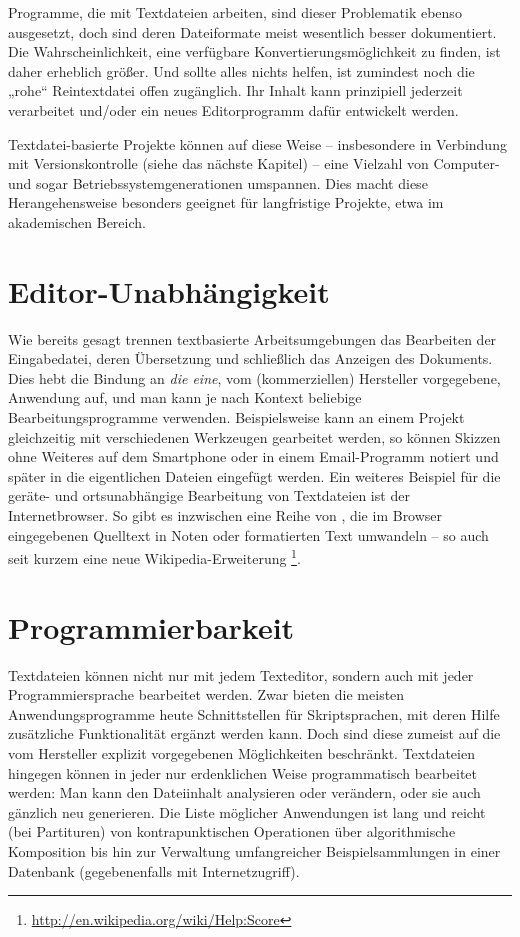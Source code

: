 \documentclass[DIV=12]{scrreprt}
\begin{document}
Programme, die mit Textdateien arbeiten, sind dieser Problematik ebenso ausgesetzt, doch sind deren Dateiformate meist wesentlich besser dokumentiert.
Die Wahrscheinlichkeit, eine verfügbare Konvertierungsmöglichkeit zu finden, ist daher erheblich größer.
Und sollte alles nichts helfen, ist zumindest noch die „rohe“ Reintextdatei offen zugänglich.
Ihr Inhalt kann prinzipiell jederzeit verarbeitet und/oder ein neues Editorprogramm dafür entwickelt werden.

Textdatei-basierte Projekte können auf diese Weise -- insbesondere in Verbindung mit Versionskontrolle (siehe das nächste Kapitel) -- eine Vielzahl von Computer- und sogar Betriebssystemgenerationen umspannen.
Dies macht diese Herangehensweise besonders geeignet für langfristige Projekte, etwa im akademischen Bereich.

\section{Editor-Unabhängigkeit}
\label{sec:pt_editor-independence}
Wie bereits gesagt trennen textbasierte Arbeitsumgebungen das Bearbeiten der Eingabedatei, deren Übersetzung und schließlich das Anzeigen des Dokuments.
Dies hebt die Bindung an \emph{die eine}, vom (kommerziellen) Hersteller vorgegebene, Anwendung auf, und man kann je nach Kontext beliebige Bearbeitungsprogramme verwenden.
Beispielsweise kann an einem Projekt gleichzeitig mit verschiedenen Werkzeugen gearbeitet werden, so können Skizzen ohne Weiteres auf dem Smartphone oder in einem Email-Programm notiert und später in die eigentlichen Dateien eingefügt werden.
Ein weiteres Beispiel für die geräte- und ortsunabhängige Bearbeitung von Textdateien ist der Internetbrowser.
So gibt es inzwischen eine Reihe von , die im Browser eingegebenen Quelltext in Noten oder formatierten Text umwandeln -- so auch seit kurzem eine neue Wikipedia-Erweiterung%
\footnote{\url{http://en.wikipedia.org/wiki/Help:Score}}.

\section{Programmierbarkeit}
\label{sec:pt_programmability}
Textdateien können nicht nur mit jedem Texteditor, sondern auch mit jeder Programmiersprache bearbeitet werden.
Zwar bieten die meisten Anwendungsprogramme heute Schnittstellen für Skriptsprachen, mit deren Hilfe zusätzliche Funktionalität ergänzt werden kann.
Doch sind diese zumeist auf die vom Hersteller explizit vorgegebenen Möglichkeiten beschränkt.
Textdateien hingegen können in jeder nur erdenklichen Weise programmatisch bearbeitet werden: Man kann den Dateiinhalt analysieren oder verändern, oder sie auch gänzlich neu generieren.
Die Liste möglicher Anwendungen ist lang und reicht (bei Partituren) von kontrapunktischen Operationen über algorithmische Komposition bis hin zur Verwaltung umfangreicher Beispielsammlungen in einer Datenbank (gegebenenfalls mit Internetzugriff).
\end{document}

